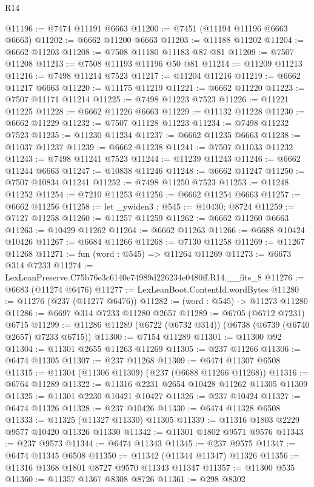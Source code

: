 \begin{lexlean}{R14}
\begin{coremodule}
@11196 := @7474 @11191 @6663
@11200 := @7451 (@11194 @11196 @6663 @6663)
@11202 := @6662 @11200 @6663
@11203 := @11188 @11202
@11204 := @6662 @11203
@11208 := @7508 @11180 @11183 @87 @81
@11209 := @7507 @11208
@11213 := @7508 @11193 @11196 @50 @81
@11214 := @11209 @11213
@11216 := @7498 @11214 @7523
@11217 := @11204 @11216
@11219 := @6662 @11217 @6663
@11220 := @11175 @11219
@11221 := @6662 @11220
@11223 := @7507 @11171 @11214
@11225 := @7498 @11223 @7523
@11226 := @11221 @11225
@11228 := @6662 @11226 @6663
@11229 := @11132 @11228
@11230 := @6662 @11229
@11232 := @7507 @11128 @11223
@11234 := @7498 @11232 @7523
@11235 := @11230 @11234
@11237 := @6662 @11235 @6663
@11238 := @11037 @11237
@11239 := @6662 @11238
@11241 := @7507 @11033 @11232
@11243 := @7498 @11241 @7523
@11244 := @11239 @11243
@11246 := @6662 @11244 @6663
@11247 := @10838 @11246
@11248 := @6662 @11247
@11250 := @7507 @10834 @11241
@11252 := @7498 @11250 @7523
@11253 := @11248 @11252
@11254 := @7210 @11253
@11256 := @6662 @11254 @6663
@11257 := @6662 @11256
@11258 := let _ywiden3 : @545 := @10430; @8724
@11259 := @7127 @11258
@11260 := @11257 @11259
@11262 := @6662 @11260 @6663
@11263 := @10429 @11262
@11264 := @6662 @11263
@11266 := @6688 @10424 @10426
@11267 := @6684 @11266
@11268 := @7130 @11258
@11269 := @11267 @11268
@11271 := fun (word : @545) => @11264 @11269
@11273 := @6673 @314 @7233
@11274 := LexLeanPreserve.C75b76e3c6140e74989d226234e0480ff.R14.__fits_8
@11276 := @6683 (@11274 @6476)
@11277 := LexLeanBoot.ContentId.wordBytes
@11280 := @11276 (@237 (@11277 @6476))
@11282 := (word : @545) -> @11273 @11280
@11286 := @6697 @314 @7233 @11280 @2657
@11289 := @6705 (@6712 @7231) @6715
@11299 := @11286 @11289 (@6722 (@6732 @314)) (@6738 (@6739 (@6740 @2657) @7233 @6715))
@11300 := @7154 @11289
@11301 := @11300 @92
@11304 := @11301 @2655 @11263 @11269
@11305 := @237 @11266
@11306 := @6474 @11305
@11307 := @237 @11268
@11309 := @6474 @11307 @6508
@11315 := @11304 (@11306 @11309) (@237 (@6688 @11266 @11268))
@11316 := @6764 @11289
@11322 := @11316 @2231 @2654 @10428 @11262 @11305 @11309
@11325 := @11301 @2230 @10421 @10427
@11326 := @237 @10424
@11327 := @6474 @11326
@11328 := @237 @10426
@11330 := @6474 @11328 @6508
@11333 := @11325 (@11327 @11330) @11305
@11339 := @11316 @1803 @2229 @9577 @10420 @11326 @11330
@11342 := @11301 @1802 @9571 @9576
@11343 := @237 @9573
@11344 := @6474 @11343
@11345 := @237 @9575
@11347 := @6474 @11345 @6508
@11350 := @11342 (@11344 @11347) @11326
@11356 := @11316 @1368 @1801 @8727 @9570 @11343 @11347
@11357 := @11300 @535
@11360 := @11357 @1367 @8308 @8726
@11361 := @298 @8302

\end{coremodule}
\end{lexlean}
